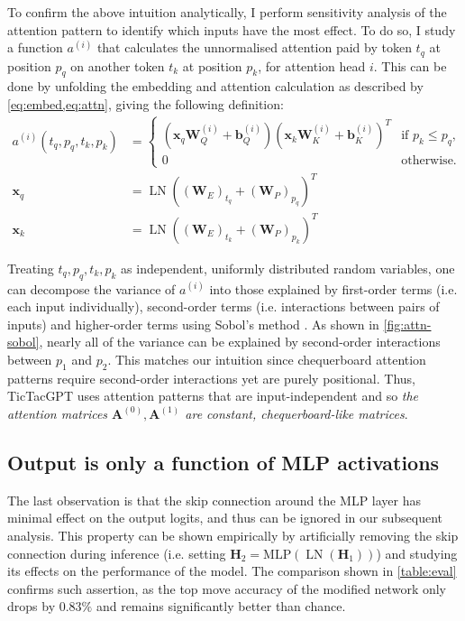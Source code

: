 \documentclass{article}
\newcommand{\ttgpt}{TicTacGPT\xspace}
\renewcommand{\v}[1]{\mathbf{\bm{#1}}}
\newcommand{\m}[1]{\mathbf{\bm{#1}}}
\DeclareMathOperator{\layernorm}{LN}
\begin{document}
To confirm the above intuition analytically, I perform sensitivity analysis of the attention pattern to identify which inputs have the most effect. To do so, I study a function $a^{(i)}$ that calculates the unnormalised attention paid by token $t_q$ at position $p_q$ on another token $t_k$ at position $p_k$, for attention head $i$. This can be done by unfolding the embedding and attention calculation as described by \cref{eq:embed,eq:attn}, giving the following definition:
\begin{equation*}
    \begin{aligned}
        a^{(i)}(t_q, p_q, t_k, p_k)
         & =\begin{cases}
                \left(\v{x}_q \m{W}_Q^{(i)} + \v{b}_Q^{(i)}\right)
                \left(\v{x}_k \m{W}_K^{(i)} + \v{b}_K^{(i)}\right)^T
                  & \text{if }p_k \leq p_q, \\
                0 & \text{otherwise.}
            \end{cases} \\
        \v{x}_q
         & = \layernorm((\m{W}_E)_{t_q} + (\m{W}_P)_{p_q})^T    \\
        \v{x}_k
         & = \layernorm((\m{W}_E)_{t_k} + (\m{W}_P)_{p_k})^T
    \end{aligned}
\end{equation*}

Treating $t_q, p_q, t_k, p_k$ as independent, uniformly distributed random variables, one can decompose the variance of $a^{(i)}$ into those explained by first-order terms (i.e. each input individually), second-order terms (i.e. interactions between pairs of inputs) and higher-order terms using Sobol's method \citep{sobol1993sensitivity,sobol2001global}. As shown in \cref{fig:attn-sobol}, nearly all of the variance can be explained by second-order interactions between $p_1$ and $p_2$. This matches our intuition since chequerboard attention patterns require second-order interactions yet are purely positional. Thus, \ttgpt uses attention patterns that are input-independent and so \emph{the attention matrices $\m{A}^{(0)}, \m{A}^{(1)}$ are constant, chequerboard-like matrices}.

\subsection{Output is only a function of MLP activations} \label{sec:simplify-output}

The last observation is that the skip connection around the MLP layer has minimal effect on the output logits, and thus can be ignored in our subsequent analysis. This property can be shown empirically by artificially removing the skip connection during inference (i.e. setting $\m{H}_2 = \text{MLP}(\layernorm(\m{H}_1))$) and studying its effects on the performance of the model. The comparison shown in \cref{table:eval} confirms such assertion, as the top move accuracy of the modified network only drops by $0.83\%$ and remains significantly better than chance.
\end{document}
